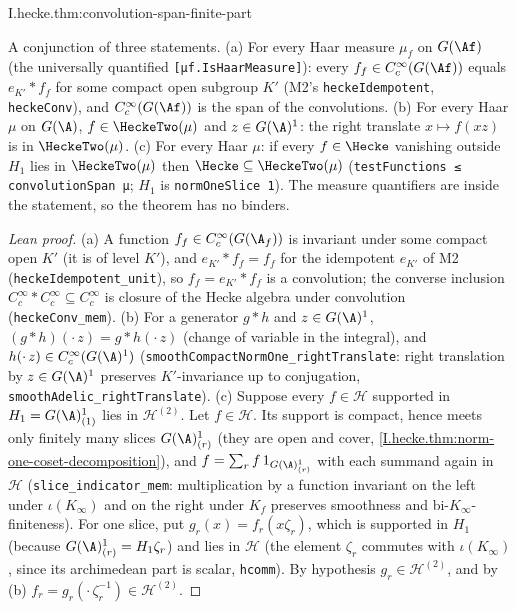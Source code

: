 \begin{tfformal}{I.hecke.thm:convolution-span-finite-part}
\begin{tffidelity}
A conjunction of three statements. (a) For every Haar measure $\mu_f$ on $G(\Af)$ (the universally quantified \texttt{[μf.IsHaarMeasure]}): every $f_f\in C_c^\infty(G(\Af))$ equals $e_{K'}*f_f$ for some compact open subgroup $K'$ (M2's \texttt{heckeIdempotent}, \texttt{heckeConv}), and $C_c^\infty(G(\Af))$ is the span of the convolutions. (b) For every Haar $\mu$ on $G(\A)$, $f\in\HeckeTwo(\mu)$ and $z\in G(\A)^1$: the right translate $x\mapsto f(xz)$ is in $\HeckeTwo(\mu)$. (c) For every Haar $\mu$: if every $f\in\Hecke$ vanishing outside $H_1$ lies in $\HeckeTwo(\mu)$ then $\Hecke\subseteq\HeckeTwo(\mu)$ (\texttt{testFunctions ≤ convolutionSpan μ}; $H_1$ is \texttt{normOneSlice 1}). The measure quantifiers are inside the statement, so the theorem has no binders.
\end{tffidelity}
\end{tfformal}
\begin{proof}[Lean proof]
(a) A function $f_f\in C_c^\infty(G(\A_f))$ is invariant under some compact open $K'$ (it is of level $K'$), and $e_{K'}\ast f_f=f_f$ for the idempotent $e_{K'}$ of M2 (\texttt{heckeIdempotent\_unit}), so $f_f=e_{K'}\ast f_f$ is a convolution; the converse inclusion $C_c^\infty\ast C_c^\infty\subseteq C_c^\infty$ is closure of the Hecke algebra under convolution (\texttt{heckeConv\_mem}). (b) For a generator $g\ast h$ and $z\in G(\A)^1$, $(g\ast h)(\cdot\,z)=g\ast h(\cdot\,z)$ (change of variable in the integral), and $h(\cdot\,z)\in C_c^\infty(G(\A)^1)$ (\texttt{smoothCompactNormOne\_rightTranslate}: right translation by $z\in G(\A)^1$ preserves $K'$-invariance up to conjugation, \texttt{smoothAdelic\_rightTranslate}). (c) Suppose every $f\in\mathcal H$ supported in $H_1=G(\A)^1_{(1)}$ lies in $\mathcal H^{(2)}$. Let $f\in\mathcal H$. Its support is compact, hence meets only finitely many slices $G(\A)^1_{(r)}$ (they are open and cover, \cref{I.hecke.thm:norm-one-coset-decomposition}), and $f=\sum_rf\,1_{G(\A)^1_{(r)}}$ with each summand again in $\mathcal H$ (\texttt{slice\_indicator\_mem}: multiplication by a function invariant on the left under $\iota(K_\infty)$ and on the right under $K_f$ preserves smoothness and bi-$K_\infty$-finiteness). For one slice, put $g_r(x)=f_r(x\zeta_r)$, which is supported in $H_1$ (because $G(\A)^1_{(r)}=H_1\zeta_r$) and lies in $\mathcal H$ (the element $\zeta_r$ commutes with $\iota(K_\infty)$, since its archimedean part is scalar, \texttt{hcomm}). By hypothesis $g_r\in\mathcal H^{(2)}$, and by (b) $f_r=g_r(\cdot\,\zeta_r^{-1})\in\mathcal H^{(2)}$.
\end{proof}

